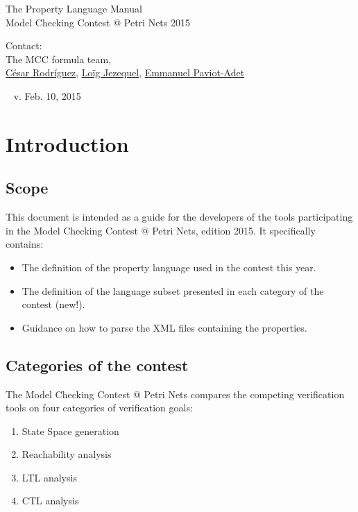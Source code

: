 \documentclass[10pt,english,a4paper]{article}
\makeatletter
\newcommand{\mcc}[0]{MCC}
\newcommand{\mccl}[0]{Model Checking Contest @ Petri Nets}
\makeatother
\begin{document}
\color{defaultcolor}

\vspace*{5cm}
\Huge
The Property Language Manual \\[10pt]
\Large
Model Checking Contest @ Petri Nets 2015

\vspace{3cm}
\large
Contact: \\[15pt]
The \mcc{} formula team, \\
\href{mailto:cesar.rodriguez@lipn.fr}{César Rodríguez},
\href{mailto:loig.jezequel@irccyn.ec-nantes.fr}{Loïg Jezequel},
\href{mailto:emmanuel.paviot-adet@lip6.fr}{Emmanuel Paviot-Adet}

\vfill
~
\hfill
\scriptsize
v\@. Feb\@. 10, 2015
\normalsize

\clearpage
\tableofcontents

\clearpage
\section{Introduction}

\subsection{Scope}

This document is intended as a guide for the developers of
the tools participating in the \mccl{}, edition 2015.
It specifically contains:

\begin{itemize}
\item
  The definition of the property language used in the contest this year.
\item
  The definition of the language subset presented in each category of the
  contest (new!).
\item
  Guidance on how to parse the XML files containing the properties.
\end{itemize}

\subsection{Categories of the contest}

The \mccl{} compares the competing verification tools on four
categories of verification goals:

\begin{enumerate}
\item State Space generation
\item Reachability analysis
\item LTL analysis
\item CTL analysis
\end{enumerate}
\end{document}

